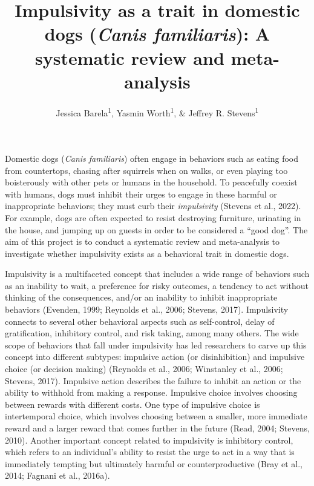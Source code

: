 \documentclass[
  ,pub,floatsintext]{apa6}
\title{Impulsivity as a trait in domestic dogs (\emph{Canis familiaris}): A systematic review and meta-analysis}
\author{Jessica Barela\textsuperscript{1}, Yasmin Worth\textsuperscript{1}, \& Jeffrey R. Stevens\textsuperscript{1}}
\date{}
\affiliation{\vspace{0.5cm}\textsuperscript{1} Department of Psychology, Center for Brain, Biology \& Behavior, University of Nebraska-Lincoln, Lincoln, NE, USA}
\begin{document}
\maketitle

Domestic dogs (\emph{Canis familiaris}) often engage in behaviors such as eating food from countertops, chasing after squirrels when on walks, or even playing too boisterously with other pets or humans in the household. To peacefully coexist with humans, dogs must inhibit their urges to engage in these harmful or inappropriate behaviors; they must curb their \emph{impulsivity} (Stevens et al., 2022). For example, dogs are often expected to resist destroying furniture, urinating in the house, and jumping up on guests in order to be considered a ``good dog''. The aim of this project is to conduct a systematic review and meta-analysis to investigate whether impulsivity exists as a behavioral trait in domestic dogs.

Impulsivity is a multifaceted concept that includes a wide range of behaviors such as an inability to wait, a preference for risky outcomes, a tendency to act without thinking of the consequences, and/or an inability to inhibit inappropriate behaviors (Evenden, 1999; Reynolds et al., 2006; Stevens, 2017). Impulsivity connects to several other behavioral aspects such as self-control, delay of gratification, inhibitory control, and risk taking, among many others. The wide scope of behaviors that fall under impulsivity has led researchers to carve up this concept into different subtypes: impulsive action (or disinhibition) and impulsive choice (or decision making) (Reynolds et al., 2006; Winstanley et al., 2006; Stevens, 2017). Impulsive action describes the failure to inhibit an action or the ability to withhold from making a response. Impulsive choice involves choosing between rewards with different costs. One type of impulsive choice is intertemporal choice, which involves choosing between a smaller, more immediate reward and a larger reward that comes further in the future (Read, 2004; Stevens, 2010). Another important concept related to impulsivity is inhibitory control, which refers to an individual's ability to resist the urge to act in a way that is immediately tempting but ultimately harmful or counterproductive (Bray et al., 2014; Fagnani et al., 2016a).
\end{document}
